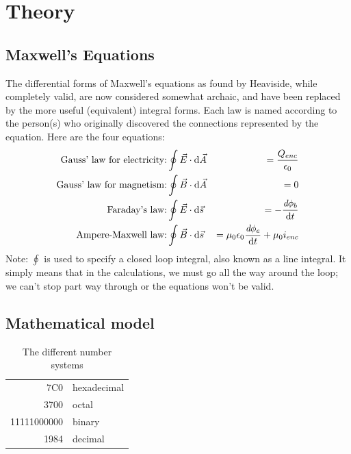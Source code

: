 \documentclass[11pt,openright]{book} %
\begin{document}
\chapter{Theory}
\label{ch:theory}

\section{Maxwell's Equations}
\label{sec:theory}
\indent The differential forms of Maxwell's equations as found by Heaviside, while completely valid, are now considered somewhat archaic, and have been replaced by the more useful (equivalent) integral forms. Each law is named according to the person(s) who originally discovered the connections represented by the equation. Here are the four equations:
\begin{eqnarray}
  \text{Gauss' law for electricity:}& \displaystyle \oint{\vec{E}\cdot\mathrm{d}\vec{A}}&=\frac{Q_{enc}}{\epsilon_0}\\
  \text{Gauss' law for magnetism:}& \displaystyle \oint{\vec{B}\cdot\mathrm{d}\vec{A}}&=0\\
  \text{Faraday's law:}& \displaystyle\oint{\vec{E}\cdot\mathrm{d}\vec{s}}&=-\frac{\emph{d}\phi_b}{\mathrm{d}t}\\
  \text{Ampere-Maxwell law:}& \displaystyle\oint{\vec{B}\cdot\mathrm{d}\vec{s}}&=\mu_0\epsilon_0\frac{\emph{d}\phi_e}{\mathrm{d}t}+\mu_0 i_{enc}
\end{eqnarray}
Note: $\oint$ is used to specify a closed loop integral, also known as a line integral. It simply means that in the calculations, we must go all the way around the loop; we can't stop part way through or the equations won't be valid.

\section{Mathematical model}
\label{sec:mathmodel}
\lipsum[8]
\begin{table}[!ht]
  \caption{The different number systems}
  \centering
  \begin{tabular}{|r|l|}
    \hline
    7C0 & hexadecimal \\
    3700 & octal \\ \cline{2-2}
    11111000000 & binary \\
    \hline \hline
    1984 & decimal \\
    \hline
  \end{tabular}
\end{table}
\end{document}
